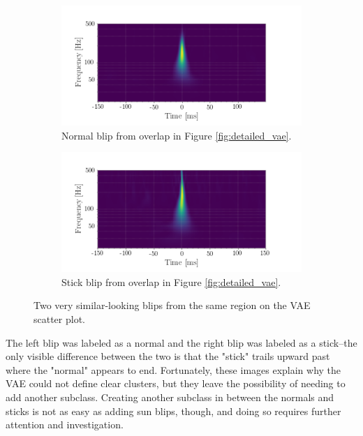 \documentclass[a4paper]{article}
\begin{document}
\begin{figure}[h!]
	\centering
	\begin{subfigure}{.49\textwidth}
		\centering
		\includegraphics[width=1\linewidth]{normalish}
		\caption{Normal blip from overlap in Figure \ref{fig:detailed_vae}.}
		\label{fig:normalish}
	\end{subfigure}
	\begin{subfigure}{.49\textwidth}
		\centering
		\includegraphics[width=1\linewidth]{stickish}
		\caption{Stick blip from overlap in Figure \ref{fig:detailed_vae}.}
		\label{fig:stickish}
	\end{subfigure}
	\caption{Two very similar-looking blips from the same region on the VAE scatter plot.}
	\label{fig:overlap}
\end{figure}

The left blip was labeled as a normal and the right blip was labeled as a stick--the only visible difference between the two is that the "stick" trails upward past where the "normal" appears to end. Fortunately, these images explain why the VAE could not define clear clusters, but they leave the possibility of needing to add another subclass. Creating another subclass in between the normals and sticks is not as easy as adding sun blips, though, and doing so requires further attention and investigation.
\end{document}
